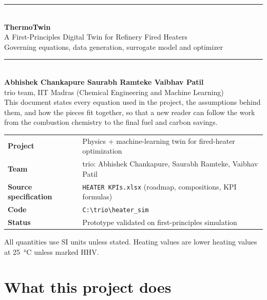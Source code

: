 \documentclass[11pt,a4paper]{article}
\begin{document}
\begin{titlepage}
\vspace*{2cm}
{\color{accent}\rule{\textwidth}{2pt}}\\[0.4cm]
{\Huge\bfseries\color{ink} ThermoTwin}\\[0.3cm]
{\LARGE\color{ink} A First-Principles Digital Twin for Refinery Fired Heaters}\\[0.5cm]
{\large\color{ink} Governing equations, data generation, surrogate model and optimizer}\\[0.3cm]
{\color{heat}\rule{\textwidth}{2pt}}\\[0.9cm]

{\large\bfseries\color{ink} Abhishek Chankapure \quad\textbullet\quad Saurabh Ramteke \quad\textbullet\quad Vaibhav Patil}\\[0.2cm]
{\color{ink} trio team, IIT Madras (Chemical Engineering and Machine Learning)}\\[1.1cm]

{\large This document states every equation used in the project, the assumptions
behind them, and how the pieces fit together, so that a new reader can follow the
work from the combustion chemistry to the final fuel and carbon savings.}\\[1.5cm]

\begin{tabular}{@{}ll@{}}
\textbf{Project} & Physics + machine-learning twin for fired-heater optimization\\
\textbf{Team} & trio: Abhishek Chankapure, Saurabh Ramteke, Vaibhav Patil\\
\textbf{Source specification} & \texttt{HEATER KPIs.xlsx} (roadmap, compositions, KPI formulas)\\
\textbf{Code} & \texttt{C:\textbackslash trio\textbackslash heater\_sim}\\
\textbf{Status} & Prototype validated on first-principles simulation\\
\end{tabular}

\vfill
{\small All quantities use SI units unless stated. Heating values are lower
heating values at \SI{25}{\celsius} unless marked HHV.}
\end{titlepage}

\tableofcontents
\newpage

\section{What this project does}
\end{document}
